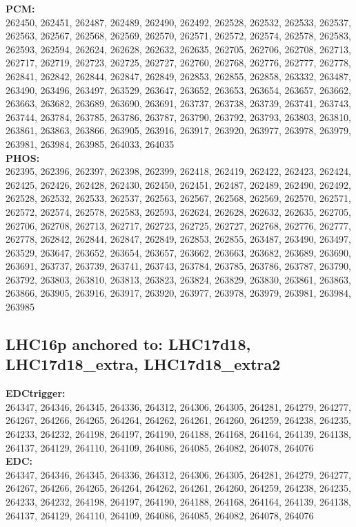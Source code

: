  \textbf{PCM:}\\
262450, 262451, 262487, 262489, 262490, 262492, 262528, 262532, 262533, 262537, 262563, 262567, 262568, 262569, 262570, 262571, 262572, 262574, 262578, 262583, 262593, 262594, 262624, 262628, 262632, 262635, 262705, 262706, 262708, 262713, 262717, 262719, 262723, 262725, 262727, 262760, 262768, 262776, 262777, 262778, 262841, 262842, 262844, 262847, 262849, 262853, 262855, 262858, 263332, 263487, 263490, 263496, 263497, 263529, 263647, 263652, 263653, 263654, 263657, 263662, 263663, 263682, 263689, 263690, 263691, 263737, 263738, 263739, 263741, 263743, 263744, 263784, 263785, 263786, 263787, 263790, 263792, 263793, 263803, 263810, 263861, 263863, 263866, 263905, 263916, 263917, 263920, 263977, 263978, 263979, 263981, 263984, 263985, 264033, 264035\\

 \textbf{PHOS:}\\
262395, 262396, 262397, 262398, 262399, 262418, 262419, 262422, 262423, 262424, 262425, 262426, 262428, 262430, 262450, 262451, 262487, 262489, 262490, 262492, 262528, 262532, 262533, 262537, 262563, 262567, 262568, 262569, 262570, 262571, 262572, 262574, 262578, 262583, 262593, 262624, 262628, 262632, 262635, 262705, 262706, 262708, 262713, 262717, 262723, 262725, 262727, 262768, 262776, 262777, 262778, 262842, 262844, 262847, 262849, 262853, 262855, 263487, 263490, 263497, 263529, 263647, 263652, 263654, 263657, 263662, 263663, 263682, 263689, 263690, 263691, 263737, 263739, 263741, 263743, 263784, 263785, 263786, 263787, 263790, 263792, 263803, 263810, 263813, 263823, 263824, 263829, 263830, 263861, 263863, 263866, 263905, 263916, 263917, 263920, 263977, 263978, 263979, 263981, 263984, 263985\\

 \subsection{LHC16p anchored to: LHC17d18, LHC17d18\_extra, LHC17d18\_extra2}

 \textbf{EDCtrigger:}\\
264347, 264346, 264345, 264336, 264312, 264306, 264305, 264281, 264279, 264277, 264267, 264266, 264265, 264264, 264262, 264261, 264260, 264259, 264238, 264235, 264233, 264232, 264198, 264197, 264190, 264188, 264168, 264164, 264139, 264138, 264137, 264129, 264110, 264109, 264086, 264085, 264082, 264078, 264076\\

 \textbf{EDC:}\\
264347, 264346, 264345, 264336, 264312, 264306, 264305, 264281, 264279, 264277, 264267, 264266, 264265, 264264, 264262, 264261, 264260, 264259, 264238, 264235, 264233, 264232, 264198, 264197, 264190, 264188, 264168, 264164, 264139, 264138, 264137, 264129, 264110, 264109, 264086, 264085, 264082, 264078, 264076\\

